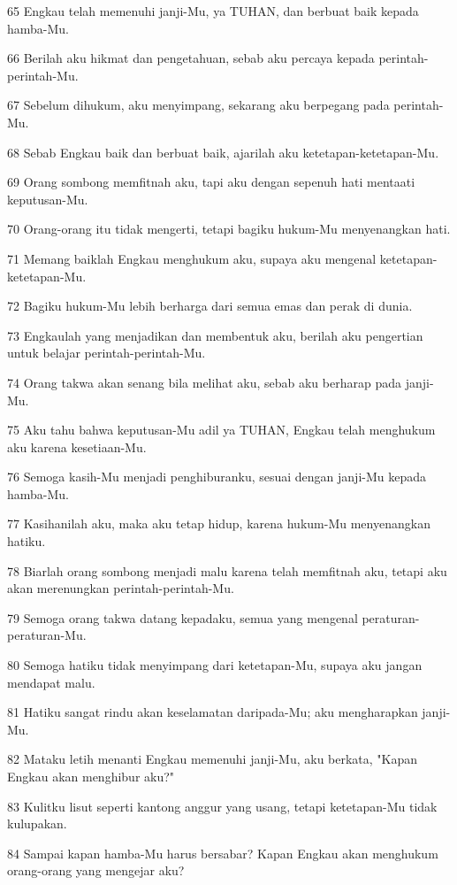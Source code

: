 \par 65 Engkau telah memenuhi janji-Mu, ya TUHAN, dan berbuat baik kepada hamba-Mu.
\par 66 Berilah aku hikmat dan pengetahuan, sebab aku percaya kepada perintah-perintah-Mu.
\par 67 Sebelum dihukum, aku menyimpang, sekarang aku berpegang pada perintah-Mu.
\par 68 Sebab Engkau baik dan berbuat baik, ajarilah aku ketetapan-ketetapan-Mu.
\par 69 Orang sombong memfitnah aku, tapi aku dengan sepenuh hati mentaati keputusan-Mu.
\par 70 Orang-orang itu tidak mengerti, tetapi bagiku hukum-Mu menyenangkan hati.
\par 71 Memang baiklah Engkau menghukum aku, supaya aku mengenal ketetapan-ketetapan-Mu.
\par 72 Bagiku hukum-Mu lebih berharga dari semua emas dan perak di dunia.
\par 73 Engkaulah yang menjadikan dan membentuk aku, berilah aku pengertian untuk belajar perintah-perintah-Mu.
\par 74 Orang takwa akan senang bila melihat aku, sebab aku berharap pada janji-Mu.
\par 75 Aku tahu bahwa keputusan-Mu adil ya TUHAN, Engkau telah menghukum aku karena kesetiaan-Mu.
\par 76 Semoga kasih-Mu menjadi penghiburanku, sesuai dengan janji-Mu kepada hamba-Mu.
\par 77 Kasihanilah aku, maka aku tetap hidup, karena hukum-Mu menyenangkan hatiku.
\par 78 Biarlah orang sombong menjadi malu karena telah memfitnah aku, tetapi aku akan merenungkan perintah-perintah-Mu.
\par 79 Semoga orang takwa datang kepadaku, semua yang mengenal peraturan-peraturan-Mu.
\par 80 Semoga hatiku tidak menyimpang dari ketetapan-Mu, supaya aku jangan mendapat malu.
\par 81 Hatiku sangat rindu akan keselamatan daripada-Mu; aku mengharapkan janji-Mu.
\par 82 Mataku letih menanti Engkau memenuhi janji-Mu, aku berkata, "Kapan Engkau akan menghibur aku?"
\par 83 Kulitku lisut seperti kantong anggur yang usang, tetapi ketetapan-Mu tidak kulupakan.
\par 84 Sampai kapan hamba-Mu harus bersabar? Kapan Engkau akan menghukum orang-orang yang mengejar aku?
